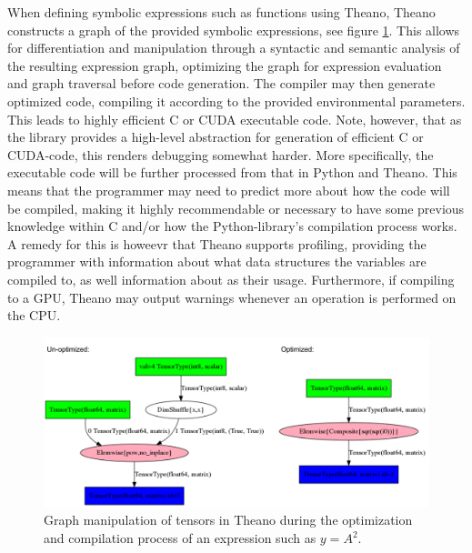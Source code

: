 When defining symbolic expressions such as functions using Theano, Theano constructs a graph of the provided symbolic expressions, see figure \ref{fig:theano_graph_demo}. This allows for differentiation and manipulation through a syntactic and semantic analysis of the resulting expression graph, optimizing the graph for expression evaluation and graph traversal before code generation. The compiler may then generate optimized code, compiling it according to the provided environmental parameters. This leads to highly efficient C or CUDA executable code.
Note, however, that as the library provides a high-level abstraction for generation of efficient C or CUDA-code, this renders debugging somewhat harder. More specifically, the executable code will be further processed from that in Python and Theano. This means that the programmer may need to predict more about how the code will be compiled, making it highly recommendable or necessary to have some previous knowledge within C and/or how the Python-library's compilation process works. A remedy for this is howeevr that Theano supports profiling, providing the programmer with information about what data structures the variables are compiled to, as well information about as their usage. Furthermore, if compiling to a GPU, Theano may output warnings whenever an operation is performed on the CPU.

\begin{figure}
\centering
\includegraphics[width=12cm]{fig/unopt_opt_theano_graph}
\caption{Graph manipulation of tensors in Theano during the optimization and compilation process of an expression such as $y = A^2$.}
\label{fig:theano_graph_demo}
\end{figure}

